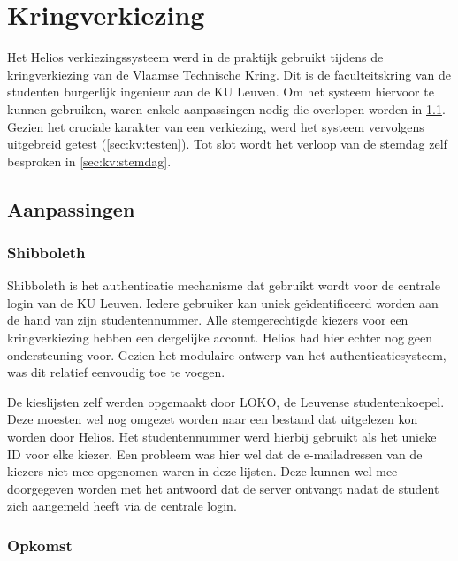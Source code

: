 % 
%


\chapter{Kringverkiezing}
\label{chap:kringverkiezing}

Het Helios verkiezingssysteem werd in de praktijk gebruikt tijdens de kringverkiezing van de Vlaamse Technische Kring. Dit is de faculteitskring van de studenten burgerlijk ingenieur aan de KU Leuven. Om het systeem hiervoor te kunnen gebruiken, waren enkele aanpassingen nodig die overlopen worden in \ref{sec:kv:aanpassingen}. Gezien het cruciale karakter van een verkiezing, werd het systeem vervolgens uitgebreid getest (\ref{sec:kv:testen}). Tot slot wordt het verloop van de stemdag zelf besproken in \ref{sec:kv:stemdag}.

\section{Aanpassingen}
\label{sec:kv:aanpassingen}

\subsection{Shibboleth}

Shibboleth is het authenticatie mechanisme dat gebruikt wordt voor de centrale login van de KU Leuven. Iedere gebruiker kan uniek ge\"identificeerd worden aan de hand van zijn studentennummer. Alle stemgerechtigde kiezers voor een kringverkiezing hebben een dergelijke account. Helios had hier echter nog geen ondersteuning voor. Gezien het modulaire ontwerp van het authenticatiesysteem, was dit relatief eenvoudig toe te voegen.

\npar De kieslijsten zelf werden opgemaakt door LOKO, de Leuvense studentenkoepel. Deze moesten wel nog omgezet worden naar een bestand dat uitgelezen kon worden door Helios. Het studentennummer werd hierbij gebruikt als het unieke ID voor elke kiezer. Een probleem was hier wel dat de e-mailadressen van de kiezers niet mee opgenomen waren in deze lijsten. Deze kunnen wel mee doorgegeven worden met het antwoord dat de server ontvangt nadat de student zich aangemeld heeft via de centrale login.

\subsection{Opkomst}

